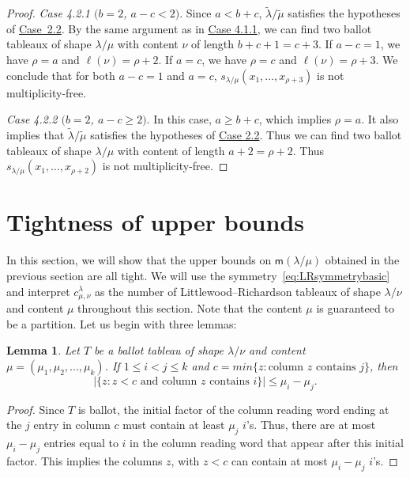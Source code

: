 \documentclass[10pt]{article}
\newtheorem{lemma}[theorem]{Lemma}
\theoremstyle{definition}
\newcommand{\msf}{\mathsf{m}}
\let\hypertargeta\hypertarget %
\let\hyperlinka\hyperlink %
\newenvironment{Case}[1]{\par\vskip2pt\noindent%
\emph{#1}.}{\vskip2pt}
\begin{document}
\begin{proof}
\begin{Case}
{\hypertargeta{theo3.13_case4.2.1}{Case 4.2.1} $(b=2$, $a-c < 2)$} 
Since $a<b+c$, $\tilde\lambda/\tilde\mu$ satisfies the hypotheses of \hyperlinka{theo3.13_case2.2}{Case~2.2}. By the same argument as in \hyperlinka{theo3.13_case4.1.1}{Case 4.1.1}, we can find two ballot tableaux of shape $\lambda / \mu$ with content $\nu$ of length $b + c + 1 = c + 3$. If $a-c=1$, we have $\rho = a$ and $\ell(\nu) = \rho + 2$. If $a = c$, we have $\rho = c$ and $\ell(\nu) = \rho + 3$. We conclude that for both $a-c=1$ and $a=c$, $s_{\lambda/\mu}(x_1,\ldots,x_{\rho+3})$ is not multiplicity-free.
\end{Case}

\begin{Case}
{\hypertargeta{theo3.13_case4.2.2}{Case 4.2.2} $(b=2$, $a-c\geq 2)$} 
In this case, $a\geq b+c$, which implies $\rho = a$. It also implies that $\tilde\lambda/\tilde\mu$ satisfies the hypotheses of \hyperlinka{theo3.13_case2.2}{Case 2.2}. Thus we can find two ballot tableaux of shape $\lambda / \mu$ with content of length $a + 2 = \rho + 2$. Thus $s_{\lambda/\mu}(x_1,\ldots,x_{\rho+2})$ is not multiplicity-free.\qedhere
\end{Case}
\end{proof}

\section{Tightness of upper bounds}

In this section, we will show that the upper bounds on $\msf (\lambda/\mu)$ obtained in the previous section are all tight. We will use the symmetry~\eqref{eq:LRsymmetrybasic} and interpret $c^{\lambda}_{\mu,\nu}$ as the number of Littlewood--Richardson tableaux of shape $\lambda/\nu$ and content $\mu$ throughout this section. Note that the content $\mu$ is guaranteed to be a partition. Let us begin with three lemmas:

\begin{lemma}\label{Lemma:basicballot}
Let $T$ be a ballot tableau of shape $\lambda/\nu$ and content $\mu = (\mu_1,\mu_2,\ldots,\mu_k)$. If $1\leq i<j\leq k$ and $c = min\{ z : \text{column $z$ contains $j$} \}$, then 
\[
|\{ z : z < c\text{ and column $z$ contains $i$} \}| \leq \mu_i-\mu_j.
\]
 \end{lemma}
\begin{proof}
Since $T$ is ballot, the initial factor of the column reading word ending at the $j$ entry in column $c$ must contain at least $\mu_j$ $i$'s. Thus, there are at most $\mu_i-\mu_j$ entries equal to $i$ in the column reading word that appear after this initial factor. This implies the columns $z$, with $z < c$ can contain at most $\mu_i-\mu_j$ $i$'s.
\end{proof}
\end{document}
